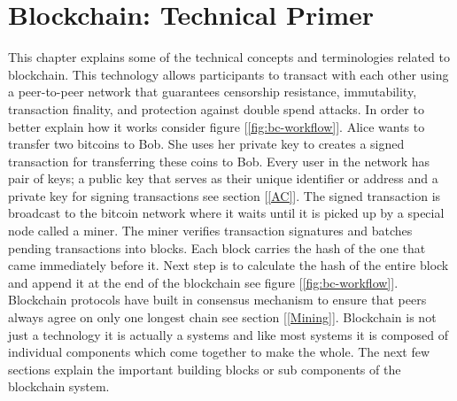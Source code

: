\section{Blockchain: Technical Primer} \label{Blockchain}
This chapter explains some of the technical concepts and terminologies related to blockchain. This technology allows participants to transact with each other using a peer-to-peer network that guarantees censorship resistance, immutability, transaction finality, and protection against double spend attacks. In order to better explain how it works consider figure [\ref{fig:bc-workflow}]. Alice wants to transfer two bitcoins to Bob. She uses her private key to creates a signed transaction for transferring these coins to Bob. Every user in the network has pair of keys; a public key that serves as their unique identifier or address and a private key for signing transactions see section [\ref{AC}]. The signed transaction is broadcast to the bitcoin network where it waits until it is picked up by a special node called a miner. The miner verifies transaction signatures and batches pending transactions into blocks. Each block carries the hash of the one that came immediately before it. Next step is to calculate the hash of the entire block and append it at the end of the blockchain see figure [\ref{fig:bc-workflow}]. Blockchain protocols have built in consensus mechanism to ensure that peers always agree on only one longest chain see section [\ref{Mining}]. Blockchain is not just a technology it is actually a systems and like most systems it is composed of individual components which come together to make the whole. The next few sections explain the important building blocks or sub components of the blockchain system.

